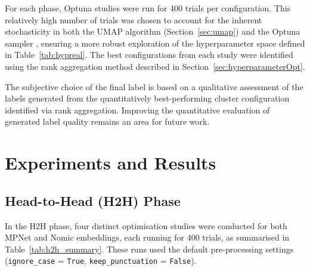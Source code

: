 \documentclass[10pt,oneside]{report}
\begin{document}
For each phase, Optuna \cite{akiba2019optuna} studies were run for 400 trials per configuration. This relatively high number of trials was chosen to account for the inherent stochasticity in both the UMAP algorithm (Section~\ref{sec:umap}) and the Optuna sampler \cite{watanabe2023tree}, ensuring a more robust exploration of the hyperparameter space defined in Table~\ref{tab:hypreal}. The best configurations from each study were identified using the rank aggregation method described in Section~\ref{sec:hyperparameterOpt}.

The subjective choice of the final label is based on a qualitative assessment of the labels generated from the quantitatively best-performing cluster configuration identified via rank aggregation. Improving the quantitative evaluation of generated label quality remains an area for future work. 

\section{Experiments and Results}\label{sec:exp_results}


\subsection{Head-to-Head (H2H) Phase}\label{sec:h2h_results}

In the H2H phase, four distinct optimisation studies were conducted for both MPNet and Nomic embeddings, each running for 400 trials, as summarised in Table~\ref{tab:h2h_summary}. These runs used the default pre-processing settings (\texttt{ignore\_case} = \texttt{True}, \texttt{keep\_punctuation} = \texttt{False}).

\end{document}
